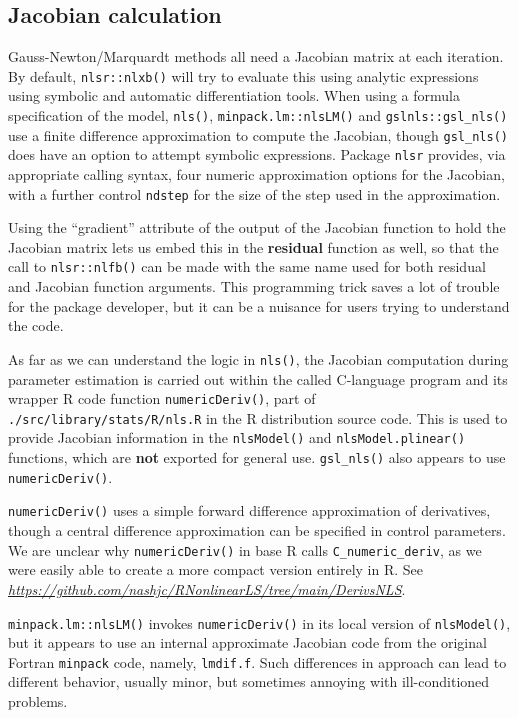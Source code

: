 \hypertarget{jacobian-calculation}{%
\subsection{Jacobian calculation}\label{jacobian-calculation}}

Gauss-Newton/Marquardt methods all need a Jacobian matrix at each iteration.
By default, \texttt{nlsr::nlxb()} will try to evaluate this using analytic
expressions using symbolic and automatic differentiation tools.
When using a formula specification of the model, \texttt{nls()}, \texttt{minpack.lm::nlsLM()}
and \texttt{gslnls::gsl\_nls()} use a finite difference approximation to compute the
Jacobian, though \texttt{gsl\_nls()} does have an option to attempt symbolic expressions.
Package \texttt{nlsr} provides, via appropriate calling syntax, four numeric approximation
options for the Jacobian, with a further control \texttt{ndstep} for the size of the
step used in the approximation.

Using the ``gradient'' attribute of the output of the Jacobian function to hold
the Jacobian matrix lets us embed this in the \textbf{residual} function as well,
so that the call to \texttt{nlsr::nlfb()} can be made with the same name used for
both residual and Jacobian function arguments. This programming trick saves a
lot of trouble for the package developer, but it can be a nuisance for users
trying to understand the code.

As far as we can understand the logic in \texttt{nls()}, the Jacobian computation during
parameter estimation is carried out within the called C-language program
and its wrapper R code function \texttt{numericDeriv()}, part of
\texttt{./src/library/stats/R/nls.R}
in the R distribution source code. This is used to provide Jacobian information in
the \texttt{nlsModel()} and \texttt{nlsModel.plinear()} functions, which are \textbf{not} exported for
general use. \texttt{gsl\_nls()} also appears to use \texttt{numericDeriv()}.

\texttt{numericDeriv()} uses a
simple forward difference approximation of derivatives, though a central
difference approximation can be specified in control parameters.
We are unclear why \texttt{numericDeriv()} in base R calls \texttt{C\_numeric\_deriv},
as we were easily able to create a more compact version entirely in R.
See \emph{\url{https://github.com/nashjc/RNonlinearLS/tree/main/DerivsNLS}}.

\texttt{minpack.lm::nlsLM()} invokes \texttt{numericDeriv()} in its local
version of \texttt{nlsModel()}, but it appears to use an internal approximate Jacobian
code from
the original Fortran \texttt{minpack} code, namely, \texttt{lmdif.f}. Such differences in approach
can lead to different behavior, usually minor, but sometimes annoying with
ill-conditioned problems.

